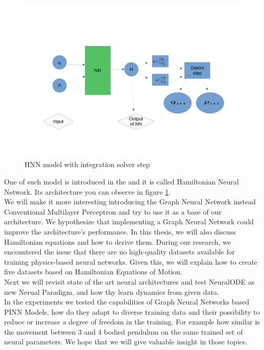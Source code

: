 \begin{figure}[h!]
	\includegraphics[width=15cm]{chapters/chapter1/hnn}
	\caption{HNN model with integration solver step}
	\label{fig:hnn}
\end{figure}
One of such model is introduced in the \cite{hnn} and it is called Hamiltonian Neural Network. Its architecture you can observe in figure \ref{fig:hnn}.\\
We will make it more interesting introducing the Graph Neural Network instead Conventional Multilayer Perceptron and try to use it as a base of our architecture. We hypothesize that implementing a Graph Neural Network could improve the architecture's performance. 
In this thesis, we will also discuss Hamiltonian equations and how to derive them. During our research, we encountered the issue that there are no high-quality datasets available for training physics-based neural networks. Given this, we will explain how to create five datasets based on Hamiltonian Equations of Motion.\\
Next we will revisit state of the art neural architectures and test NeuralODE as new Nerual Paradigm, and how thy learn dynamics from given data.\\
In the experiments we tested the capabilities of Graph Neural Networks based PINN Models, how do they adapt to diverse training data and their possibility to reduce or increase a degree of freedom in the training. For example how similar is the movement between 3 and 4 bodied pendulum on the same trained set of neural parameters. We hope that we will give valuable insight in those topics.    








